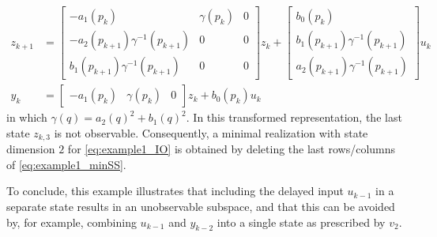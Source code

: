 \begin{subequations} \label{eq:example1_minSS}
\begin{align}
    z_{k+1} &= \left[\begin{array}{cc|c}
        -a_1(p_k) & \gamma(p_k) & 0 \\
        -a_2(p_{k+1}) \gamma^{-1}(p_{k+1}) & 0 & 0 \\
        \hline b_1(p_{k+1}) \gamma^{-1}(p_{k+1}) & 0 & 0
    \end{array} \right] z_k + 
    \begin{bmatrix}
        b_0(p_k) \\ b_1(p_{k+1}) \gamma^{-1}(p_{k+1}) \\ \hline a_2(p_{k+1}) \gamma^{-1}(p_{k+1})
    \end{bmatrix} u_k \\
    y_k &=
    \left[\begin{array}{cc|c} -a_1(p_k) & \gamma(p_k) & 0 \end{array} \right] z_k + b_0(p_k) u_k
\end{align}
\end{subequations}
in which $\gamma(q) = a_2(q)^2 + b_1(q)^2$. In this transformed representation, the last state $z_{k,3}$ is not observable. Consequently, a minimal realization with state dimension $2$ for \eqref{eq:example1_IO} is obtained by deleting the last rows/columns of \eqref{eq:example1_minSS}.

To conclude, this example illustrates that including the delayed input $u_{k-1}$ in a separate state results in an unobservable subspace, and that this can be avoided by, for example, combining $u_{k-1}$ and $y_{k-2}$ into a single state as prescribed by $v_2$. 

